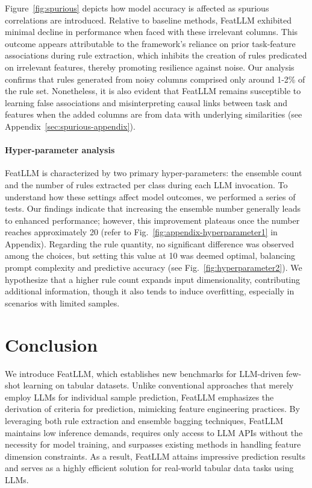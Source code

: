 Figure~\ref{fig:spurious} depicts how model accuracy is affected as spurious correlations are introduced. Relative to baseline methods, \textsf{FeatLLM} exhibited minimal decline in performance when faced with these irrelevant columns. This outcome appears attributable to the framework’s reliance on prior task-feature associations during rule extraction, which inhibits the creation of rules predicated on irrelevant features, thereby promoting resilience against noise. Our analysis confirms that rules generated from noisy columns comprised only around 1-2\% of the rule set. Nonetheless, it is also evident that \textsf{FeatLLM} remains susceptible to learning false associations and misinterpreting causal links between task and features when the added columns are from data with underlying similarities (see Appendix~\ref{sec:spurious-appendix}).

\vspace*{-0.12in}
\paragraph{Hyper-parameter analysis}
\textsf{FeatLLM} is characterized by two primary hyper-parameters: the ensemble count and the number of rules extracted per class during each LLM invocation. To understand how these settings affect model outcomes, we performed a series of tests. Our findings indicate that increasing the ensemble number generally leads to enhanced performance; however, this improvement plateaus once the number reaches approximately 20 (refer to Fig.~\ref{fig:appendix-hyperparameter1} in Appendix). Regarding the rule quantity, no significant difference was observed among the choices, but setting this value at 10 was deemed optimal, balancing prompt complexity and predictive accuracy (see Fig.~\ref{fig:hyperparameter2}). We hypothesize that a higher rule count expands input dimensionality, contributing additional information, though it also tends to induce overfitting, especially in scenarios with limited samples.

\section{Conclusion}
We introduce \textsf{FeatLLM}, which establishes new benchmarks for LLM-driven few-shot learning on tabular datasets. Unlike conventional approaches that merely employ LLMs for individual sample prediction, \textsf{FeatLLM} emphasizes the derivation of criteria for prediction, mimicking feature engineering practices. By leveraging both rule extraction and ensemble bagging techniques, \textsf{FeatLLM} maintains low inference demands, requires only access to LLM APIs without the necessity for model training, and surpasses existing methods in handling feature dimension constraints. As a result, \textsf{FeatLLM} attains impressive prediction results and serves as a highly efficient solution for real-world tabular data tasks using LLMs.

